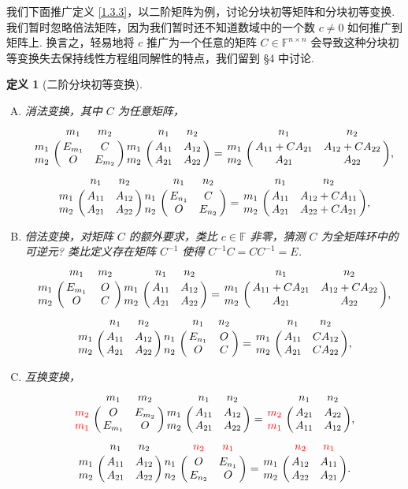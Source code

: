 \documentclass[10pt,openany]{article}
\theoremstyle{thmstyle} %
\theoremstyle{defstyle} %
\newtheorem{definition}[theorem]{定义}
\theoremstyle{prostyle} %
\theoremstyle{exastyle}
\theoremstyle{remstyle}
\newcommand{\F}{\mathbb{F}}
\newcommand{\n}{^{n \times n}}
\begin{document}
我们下面推广定义 \ref{1.3.3}，以二阶矩阵为例，讨论分块初等矩阵和分块初等变换. 我们暂时忽略倍法矩阵，因为我们暂时还不知道数域中的一个数 \( c \neq 0 \) 如何推广到矩阵上. 换言之，轻易地将 \( c \) 推广为一个任意的矩阵 \( C \in \F\n \) 会导致这种分块初等变换失去保持线性方程组同解性的特点，我们留到 \S 4 中讨论.

\begin{definition}[二阶分块初等变换]
	\begin{enumerate}[(A)]
		\item 消法变换，其中 \( C \) 为任意矩阵，
		\[ \bordermatrix{
			& m_1 & m_2 \cr
			m_1 & E_{m_1} & C \cr
			m_2 & O & E_{m_2}
		}\bordermatrix{
			& n_1 & n_2 \cr
			m_1 & A_{11} & A_{12} \cr
			m_2 & A_{21} & A_{22}
		}= \bordermatrix{
			& n_1 & n_2 \cr
			m_1 & A_{11}+CA_{21} & A_{12}+CA_{22} \cr
			m_2 & A_{21} & A_{22}
		}, \]
		\[ \bordermatrix{
			& n_1 & n_2 \cr
			m_1 & A_{11} & A_{12} \cr
			m_2 & A_{21} & A_{22}
		}\bordermatrix{
			& n_1 & n_2 \cr
			n_1 & E_{n_1} & C \cr
			n_2 & O & E_{n_2}
		}= \bordermatrix{
			& n_1 & n_2 \cr
			m_1 & A_{11} & A_{12}+CA_{11} \cr
			m_2 & A_{21} & A_{22}+CA_{21}
		}, \]
		
		\item 倍法变换，对矩阵 \( C \) 的额外要求，类比 \( c \in \F \) 非零，猜测 \( C \) 为全矩阵环中的可逆元? 类比定义存在矩阵 \( C^{-1} \) 使得 \( C^{-1}C=CC^{-1}=E\).
		\[ \bordermatrix{
			& m_1 & m_2 \cr
			m_1 & E_{m_1} & O  \cr
			m_2 & O & C
		}\bordermatrix{
			& n_1 & n_2 \cr
			m_1 & A_{11} & A_{12} \cr
			m_2 & A_{21} & A_{22}
		}= \bordermatrix{
			& n_1 & n_2 \cr
			m_1 & A_{11}+CA_{21} & A_{12}+CA_{22} \cr
			m_2 & A_{21} & A_{22}
		}, \]
		\[ \bordermatrix{
			& n_1 & n_2 \cr
			m_1 & A_{11} & A_{12} \cr
			m_2 & A_{21} & A_{22}
		}\bordermatrix{
		& n_1 & n_2 \cr
		n_1 & E_{n_1} & O  \cr
		n_2 & O & C
		}= \bordermatrix{
			& n_1 & n_2 \cr
			m_1 & A_{11} & CA_{12} \cr
			m_2 & A_{21} & CA_{22}
		}, \]
		
		\item 互换变换，
		\[ \bordermatrix{
			& m_1 & m_2 \cr
			{\color{red} m_2} & O & E_{m_2} \cr
			{\color{red} m_1} & E_{m_1} & O
		}\bordermatrix{
			& n_1 & n_2 \cr
			m_1 & A_{11} & A_{12} \cr
			m_2 & A_{21} & A_{22}
		}= \bordermatrix{
			& n_1 & n_2 \cr
			{\color{red} m_2} & A_{21} & A_{22} \cr
			{\color{red} m_1} & A_{11} & A_{12}
		}, \]
		\[ \bordermatrix{
			& n_1 & n_2 \cr
			m_1 & A_{11} & A_{12} \cr
			m_2 & A_{21} & A_{22}
		} \bordermatrix{
		& {\color{red} n_2} & {\color{red} n_1} \cr
		n_1 & O & E_{n_1} \cr
		n_2 & E_{n_2} & O
		}= \bordermatrix{
			& {\color{red} n_2} & {\color{red} n_1} \cr
			m_1 & A_{12} & A_{11} \cr
			m_2 & A_{22} & A_{21}
		}. \]
	\end{enumerate}

\end{definition}
\end{document}
